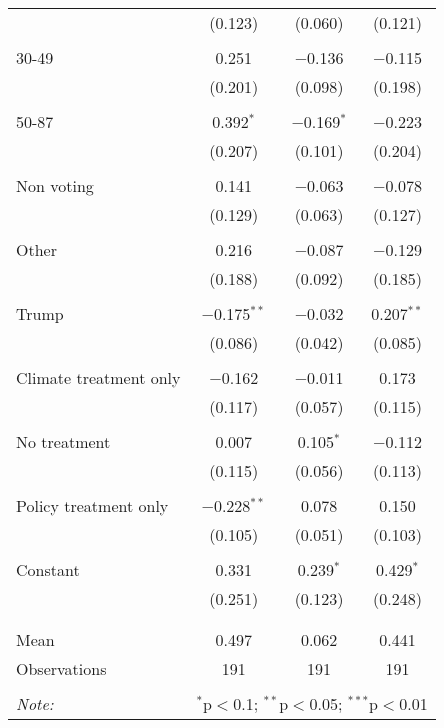 \begin{tabular}{@{\extracolsep{5pt}}lccc}
  & (0.123) & (0.060) & (0.121) \\ 
  & & & \\ 
 30-49 & 0.251 & $-$0.136 & $-$0.115 \\ 
  & (0.201) & (0.098) & (0.198) \\ 
  & & & \\ 
 50-87 & 0.392$^{*}$ & $-$0.169$^{*}$ & $-$0.223 \\ 
  & (0.207) & (0.101) & (0.204) \\ 
  & & & \\ 
 Non voting & 0.141 & $-$0.063 & $-$0.078 \\ 
  & (0.129) & (0.063) & (0.127) \\ 
  & & & \\ 
 Other & 0.216 & $-$0.087 & $-$0.129 \\ 
  & (0.188) & (0.092) & (0.185) \\ 
  & & & \\ 
 Trump & $-$0.175$^{**}$ & $-$0.032 & 0.207$^{**}$ \\ 
  & (0.086) & (0.042) & (0.085) \\ 
  & & & \\ 
 Climate treatment only & $-$0.162 & $-$0.011 & 0.173 \\ 
  & (0.117) & (0.057) & (0.115) \\ 
  & & & \\ 
 No treatment & 0.007 & 0.105$^{*}$ & $-$0.112 \\ 
  & (0.115) & (0.056) & (0.113) \\ 
  & & & \\ 
 Policy treatment only & $-$0.228$^{**}$ & 0.078 & 0.150 \\ 
  & (0.105) & (0.051) & (0.103) \\ 
  & & & \\ 
 Constant & 0.331 & 0.239$^{*}$ & 0.429$^{*}$ \\ 
  & (0.251) & (0.123) & (0.248) \\ 
  & & & \\ 
\hline \\[-1.8ex] 
Mean & 0.497 & 0.062 & 0.441 \\ 
Observations & 191 & 191 & 191 \\ 
\hline 
\hline \\[-1.8ex] 
\textit{Note:}  & \multicolumn{3}{r}{$^{*}$p$<$0.1; $^{**}$p$<$0.05; $^{***}$p$<$0.01} \\ 
\end{tabular} 
